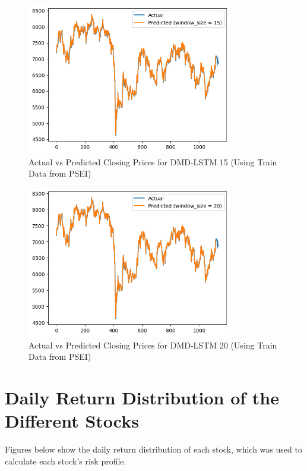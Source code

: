 \begin{figure}[ht]
    \centering
    \includegraphics[width=0.80\textwidth]{./assets/Appendices/B/Model_Testing/dmd_lstm15.png}
    \caption{Actual vs Predicted Closing Prices for DMD-LSTM 15 (Using Train Data from PSEI)}
    \label{fig:modelTest_dmd_lstm15}
\end{figure}
\FloatBarrier

\begin{figure}[ht]
    \centering
    \includegraphics[width=0.80\textwidth]{./assets/Appendices/B/Model_Testing/dmd_lstm20.png}
    \caption{Actual vs Predicted Closing Prices for DMD-LSTM 20 (Using Train Data from PSEI)}
    \label{fig:modelTest_dmd_lstm20}
\end{figure}
\FloatBarrier


\section{Daily Return Distribution of the Different Stocks}
\label{sec:daily_return_distribution}
Figures below show the daily return distribution of each stock, which was used to 
calculate each stock's risk profile.

